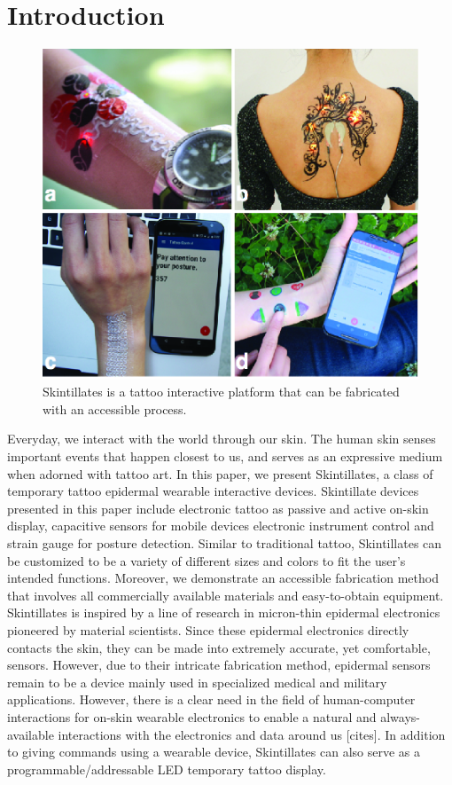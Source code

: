 \documentclass{sigchi}
\begin{document}

\section{Introduction}
\begin{figure}[!h]
\centering
\includegraphics[width=1\columnwidth]{figures/Figure1}
\caption{Skintillates is a tattoo interactive platform that can be fabricated with an accessible process.}
\label{fig:figure1}
\end{figure}
Everyday, we interact with the world through our skin. The human skin senses important events that happen closest to us, and serves as an expressive medium when adorned with tattoo art. In this paper, we present Skintillates, a class of temporary tattoo epidermal wearable interactive devices. Skintillate devices presented in this paper include electronic tattoo as passive and active on-skin display, capacitive sensors for mobile devices electronic instrument control and strain gauge for posture detection. Similar to traditional tattoo, Skintillates can be customized to be a variety of different sizes and colors to fit the user’s intended functions. Moreover, we demonstrate an accessible fabrication method that involves all commercially available materials and easy-to-obtain equipment. 
Skintillates is inspired by a line of research in micron-thin epidermal electronics pioneered by material scientists. Since these epidermal electronics directly contacts the skin, they can be made into extremely accurate, yet comfortable, sensors. However, due to their intricate fabrication method, epidermal sensors remain to be a device mainly used in specialized medical and military applications. However, there is a clear need in the field of human-computer interactions for on-skin wearable electronics to enable a natural and always-available interactions with the electronics and data around us [cites]. In addition to giving commands using a wearable device, Skintillates can also serve as a programmable/addressable LED temporary tattoo display. 
\end{document}
